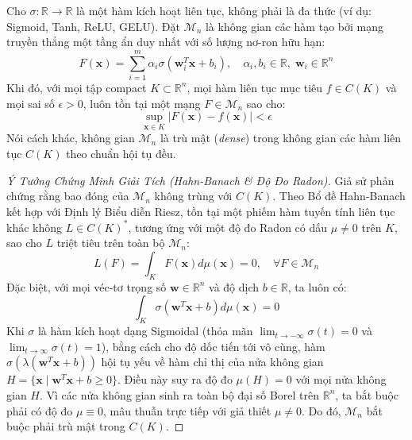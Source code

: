 \begin{theorem}
Cho $\sigma: \mathbb{R} \to \mathbb{R}$ là một hàm kích hoạt liên tục, không phải là đa thức (ví dụ: Sigmoid, Tanh, ReLU, GELU). Đặt $\mathcal{M}_n$ là không gian các hàm tạo bởi mạng truyền thẳng một tầng ẩn duy nhất với số lượng nơ-ron hữu hạn:
\begin{equation}
F(\mathbf{x}) = \sum_{i=1}^m \alpha_i \sigma(\mathbf{w}_i^T \mathbf{x} + b_i), \quad \alpha_i, b_i \in \mathbb{R}, \; \mathbf{w}_i \in \mathbb{R}^n
\end{equation}
Khi đó, với mọi tập compact $K \subset \mathbb{R}^n$, mọi hàm liên tục mục tiêu $f \in C(K)$ và mọi sai số $\epsilon > 0$, luôn tồn tại một mạng $F \in \mathcal{M}_n$ sao cho:
\begin{equation}
\sup_{\mathbf{x} \in K} |F(\mathbf{x}) - f(\mathbf{x})| < \epsilon
\end{equation}
Nói cách khác, không gian $\mathcal{M}_n$ là trù mật (\textit{dense}) trong không gian các hàm liên tục $C(K)$ theo chuẩn hội tụ đều.
\end{theorem}

\begin{proof}[Ý Tưởng Chứng Minh Giải Tích (Hahn-Banach \& Độ Đo Radon)]
Giả sử phản chứng rằng bao đóng của $\mathcal{M}_n$ không trùng với $C(K)$. Theo Bổ đề Hahn-Banach kết hợp với Định lý Biểu diễn Riesz, tồn tại một phiếm hàm tuyến tính liên tục khác không $L \in C(K)^*$, tương ứng với một độ đo Radon có dấu $\mu \neq 0$ trên $K$, sao cho $L$ triệt tiêu trên toàn bộ $\mathcal{M}_n$:
\begin{equation}
L(F) = \int_K F(\mathbf{x}) d\mu(\mathbf{x}) = 0, \quad \forall F \in \mathcal{M}_n
\end{equation}
Đặc biệt, với mọi véc-tơ trọng số $\mathbf{w} \in \mathbb{R}^n$ và độ dịch $b \in \mathbb{R}$, ta luôn có:
\begin{equation}
\int_K \sigma(\mathbf{w}^T \mathbf{x} + b) d\mu(\mathbf{x}) = 0
\end{equation}
Khi $\sigma$ là hàm kích hoạt dạng Sigmoidal (thỏa mãn $\lim_{t \to -\infty} \sigma(t) = 0$ và $\lim_{t \to \infty} \sigma(t) = 1$), bằng cách cho độ dốc tiến tới vô cùng, hàm $\sigma(\lambda(\mathbf{w}^T \mathbf{x} + b))$ hội tụ yếu về hàm chỉ thị của nửa không gian $H = \{\mathbf{x} \mid \mathbf{w}^T \mathbf{x} + b \ge 0\}$.
Điều này suy ra độ đo $\mu(H) = 0$ với mọi nửa không gian $H$. Vì các nửa không gian sinh ra toàn bộ đại số Borel trên $\mathbb{R}^n$, ta bắt buộc phải có độ đo $\mu \equiv 0$, mâu thuẫn trực tiếp với giả thiết $\mu \neq 0$.
Do đó, $\mathcal{M}_n$ bắt buộc phải trù mật trong $C(K)$.
\end{proof}

